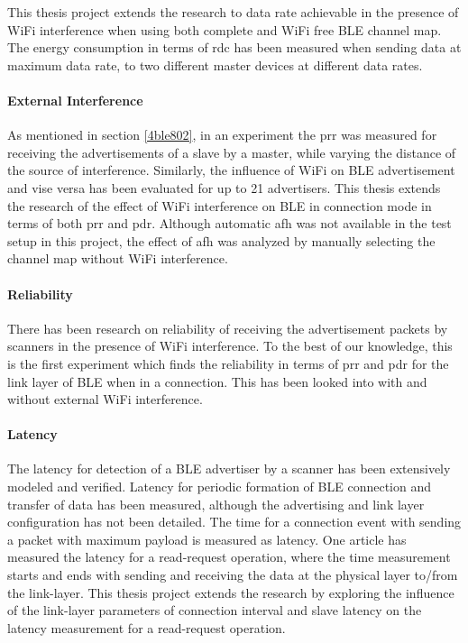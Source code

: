 This thesis project extends the research to data rate achievable in the presence of WiFi interference when using both complete and WiFi free BLE channel map. The energy consumption in terms of \gls{rdc} has been measured when sending data at maximum data rate, to two different master devices at different data rates.

\paragraph{External Interference}
As mentioned in section \ref{4ble802}, in an experiment\cite{Siekkinen2012} the \gls{prr} was measured for receiving the advertisements of a slave by a master, while varying the distance of the source of interference. Similarly, the influence of WiFi on BLE advertisement and vise versa has been evaluated for up to 21 advertisers\cite{Wyffels}. This thesis extends the research of the effect of WiFi interference on BLE in connection mode in terms of both \gls{prr} and \gls{pdr}. Although automatic \gls{afh} was not available in the test setup in this project, the effect of \gls{afh} was analyzed by manually selecting the channel map without WiFi interference. 

\paragraph{Reliability} There has been research on reliability of receiving the advertisement packets by scanners in the presence of WiFi interference\cite{Wyffels}\cite{Siekkinen2012}. To the best of our knowledge, this is the first experiment which finds the reliability in terms of \gls{prr} and \gls{pdr} for the link layer of BLE when in a connection. This has been looked into with and without external WiFi interference.

\paragraph{Latency}
The latency for detection of a BLE advertiser by a scanner has been extensively modeled and verified\cite{Kindt2014}\cite{Liu2012}. Latency for periodic formation of BLE connection and transfer of data has been measured\cite{Dementyev2013}, although the advertising and link layer configuration has not been detailed. The time for a connection event with sending a packet with maximum payload is measured as latency\cite{Gomez2012}. One article has measured the latency for a read-request operation, where the time measurement starts and ends with sending and receiving the data at the physical layer to/from the link-layer\cite{Mikhaylov2013}. This thesis project extends the research by exploring the influence of the link-layer parameters of connection interval and slave latency on the latency measurement for a read-request operation.

